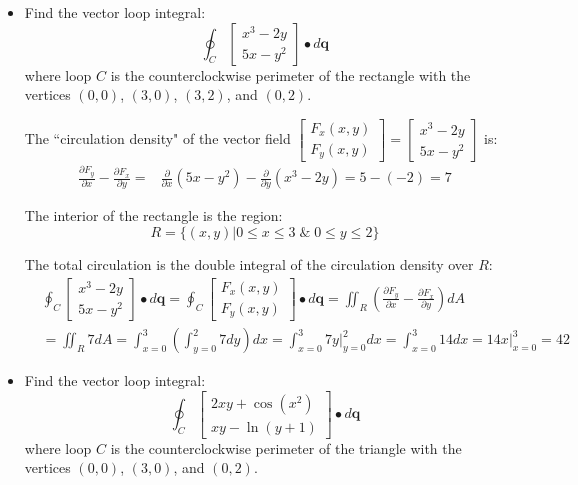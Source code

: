 \documentclass{article}
\begin{document}
\begin{itemize}
\item Find the vector loop integral:
\[\oint_C \begin{bmatrix} x^3 - 2y \\ 5x - y^2 \end{bmatrix} \bullet d\mathbf{q}\]
where loop \(C\) is the counterclockwise perimeter of the rectangle with the vertices \((0, 0)\), \((3, 0)\), \((3, 2)\), and \((0, 2)\).

The ``circulation density" of the vector field \(\begin{bmatrix} F_x(x,y) \\ F_y(x,y) \end{bmatrix} = \begin{bmatrix} x^3 - 2y \\ 5x - y^2 \end{bmatrix}\) is: 
\begin{align*}
\frac{\partial F_y}{\partial x} - \frac{\partial F_x}{\partial y} = & \frac{\partial}{\partial x}(5x - y^2) - \frac{\partial}{\partial y}(x^3 - 2y) = 5 - (-2) = 7 
\end{align*}

The interior of the rectangle is the region:
\[R = \{(x,y) | 0 \leq x \leq 3 \;\&\; 0 \leq y \leq 2\}\] 

The total circulation is the double integral of the circulation density over \(R\):
\begin{align*}
& \oint_C \begin{bmatrix} x^3 - 2y \\ 5x - y^2 \end{bmatrix} \bullet d\mathbf{q} 
= \oint_C \begin{bmatrix} F_x(x,y) \\ F_y(x,y) \end{bmatrix} \bullet d\mathbf{q} 
= \iint_R \left(\frac{\partial F_y}{\partial x} - \frac{\partial F_x}{\partial y}\right)dA \\ 
& = \iint_R 7 dA 
= \int_{x = 0}^3 \left(\int_{y = 0}^2 7dy\right)dx 
= \int_{x = 0}^3 7y\Big|_{y = 0}^2 dx 
= \int_{x = 0}^3 14 dx 
= 14x\Big|_{x = 0}^3 
= 42
\end{align*}

\item Find the vector loop integral:
\[\oint_C \begin{bmatrix} 2xy + \cos(x^2) \\ xy - \ln(y + 1) \end{bmatrix} \bullet d\mathbf{q}\]
where loop \(C\) is the counterclockwise perimeter of the triangle with the vertices \((0, 0)\), \((3, 0)\), and \((0, 2)\).


\end{itemize}
\end{document}
